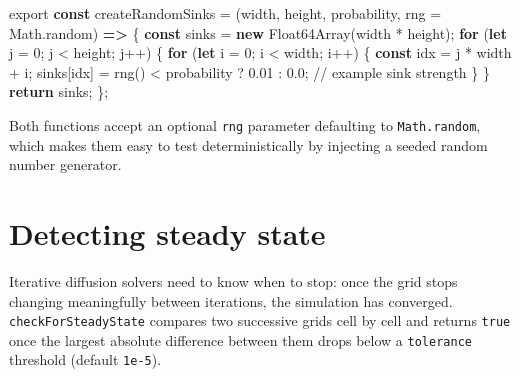 \documentclass[
  letterpaper,
  DIV=11,
  numbers=noendperiod]{scrreprt}
\newenvironment{Shaded}{\begin{snugshade}}{\end{snugshade}}
\newcommand{\BuiltInTok}[1]{\textcolor[rgb]{0.00,0.23,0.31}{#1}}
\newcommand{\CommentTok}[1]{\textcolor[rgb]{0.37,0.37,0.37}{#1}}
\newcommand{\ControlFlowTok}[1]{\textcolor[rgb]{0.00,0.23,0.31}{\textbf{#1}}}
\newcommand{\DecValTok}[1]{\textcolor[rgb]{0.68,0.00,0.00}{#1}}
\newcommand{\FloatTok}[1]{\textcolor[rgb]{0.68,0.00,0.00}{#1}}
\newcommand{\FunctionTok}[1]{\textcolor[rgb]{0.28,0.35,0.67}{#1}}
\newcommand{\ImportTok}[1]{\textcolor[rgb]{0.00,0.46,0.62}{#1}}
\newcommand{\KeywordTok}[1]{\textcolor[rgb]{0.00,0.23,0.31}{\textbf{#1}}}
\newcommand{\NormalTok}[1]{\textcolor[rgb]{0.00,0.23,0.31}{#1}}
\newcommand{\OperatorTok}[1]{\textcolor[rgb]{0.37,0.37,0.37}{#1}}
\begin{document}
\label{helpers-random-generators}%
\begin{Shaded}
\begin{Highlighting}[]

\ImportTok{export} \KeywordTok{const}\NormalTok{ createRandomSinks }\OperatorTok{=}\NormalTok{ (width}\OperatorTok{,}\NormalTok{ height}\OperatorTok{,}\NormalTok{ probability}\OperatorTok{,}\NormalTok{ rng }\OperatorTok{=} \BuiltInTok{Math}\OperatorTok{.}\FunctionTok{random}\NormalTok{) }\KeywordTok{=\textgreater{}}\NormalTok{ \{}
    \KeywordTok{const}\NormalTok{ sinks }\OperatorTok{=} \KeywordTok{new} \BuiltInTok{Float64Array}\NormalTok{(width }\OperatorTok{*}\NormalTok{ height)}\OperatorTok{;}
    \ControlFlowTok{for}\NormalTok{ (}\KeywordTok{let}\NormalTok{ j }\OperatorTok{=} \DecValTok{0}\OperatorTok{;}\NormalTok{ j }\OperatorTok{\textless{}}\NormalTok{ height}\OperatorTok{;}\NormalTok{ j}\OperatorTok{++}\NormalTok{) \{}
        \ControlFlowTok{for}\NormalTok{ (}\KeywordTok{let}\NormalTok{ i }\OperatorTok{=} \DecValTok{0}\OperatorTok{;}\NormalTok{ i }\OperatorTok{\textless{}}\NormalTok{ width}\OperatorTok{;}\NormalTok{ i}\OperatorTok{++}\NormalTok{) \{}
            \KeywordTok{const}\NormalTok{ idx }\OperatorTok{=}\NormalTok{ j }\OperatorTok{*}\NormalTok{ width }\OperatorTok{+}\NormalTok{ i}\OperatorTok{;}
\NormalTok{            sinks[idx] }\OperatorTok{=} \FunctionTok{rng}\NormalTok{() }\OperatorTok{\textless{}}\NormalTok{ probability }\OperatorTok{?} \FloatTok{0.01} \OperatorTok{:} \FloatTok{0.0}\OperatorTok{;} \CommentTok{// example sink strength}
\NormalTok{        \}}
\NormalTok{    \}}
    \ControlFlowTok{return}\NormalTok{ sinks}\OperatorTok{;}
\NormalTok{\}}\OperatorTok{;}
\end{Highlighting}
\end{Shaded}

Both functions accept an optional \texttt{rng} parameter defaulting to
\texttt{Math.random}, which makes them easy to test deterministically by
injecting a seeded random number generator.

\section{Detecting steady state}\label{detecting-steady-state}

Iterative diffusion solvers need to know when to stop: once the grid
stops changing meaningfully between iterations, the simulation has
converged. \texttt{checkForSteadyState} compares two successive grids
cell by cell and returns \texttt{true} once the largest absolute
difference between them drops below a \texttt{tolerance} threshold
(default \texttt{1e-5}).
\end{document}
